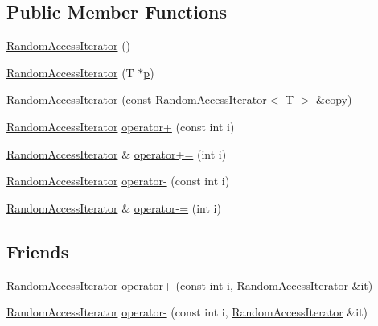 \subsection*{Public Member Functions}
\begin{DoxyCompactItemize}
\item 
\hyperlink{classprism_1_1_random_access_iterator_acb6e10c9ddfe99117be8d6655636a23c}{Random\+Access\+Iterator} ()
\item 
\hyperlink{classprism_1_1_random_access_iterator_aca286b76b9426a9be2224545ecce50e5}{Random\+Access\+Iterator} (T $\ast$\hyperlink{classprism_1_1_forward_iterator_a44e23472687df2dcf68780ba6173557a}{p})
\item 
\hyperlink{classprism_1_1_random_access_iterator_a6aeddeeacdf3146e6b48b05c8f86ac65}{Random\+Access\+Iterator} (const \hyperlink{classprism_1_1_random_access_iterator}{Random\+Access\+Iterator}$<$ T $>$ \&\hyperlink{namespaceprism_ae776f4cd825f79e7af1cf6ee1d90a209}{copy})
\item 
\hyperlink{classprism_1_1_random_access_iterator}{Random\+Access\+Iterator} \hyperlink{classprism_1_1_random_access_iterator_aebe91fcd9ac3a4bc5f2f2ede7ff51f49}{operator+} (const int i)
\item 
\hyperlink{classprism_1_1_random_access_iterator}{Random\+Access\+Iterator} \& \hyperlink{classprism_1_1_random_access_iterator_af66da8fe8bd73912a18dc14cf96c237c}{operator+=} (int i)
\item 
\hyperlink{classprism_1_1_random_access_iterator}{Random\+Access\+Iterator} \hyperlink{classprism_1_1_random_access_iterator_ac530d8ed2369500753f4091eba88142c}{operator-\/} (const int i)
\item 
\hyperlink{classprism_1_1_random_access_iterator}{Random\+Access\+Iterator} \& \hyperlink{classprism_1_1_random_access_iterator_ae17e26f0b1664830170c4373e951f3a5}{operator-\/=} (int i)
\end{DoxyCompactItemize}
\subsection*{Friends}
\begin{DoxyCompactItemize}
\item 
\hyperlink{classprism_1_1_random_access_iterator}{Random\+Access\+Iterator} \hyperlink{classprism_1_1_random_access_iterator_af54fbcdeeec8255f8e3d2742c952ea22}{operator+} (const int i, \hyperlink{classprism_1_1_random_access_iterator}{Random\+Access\+Iterator} \&it)
\item 
\hyperlink{classprism_1_1_random_access_iterator}{Random\+Access\+Iterator} \hyperlink{classprism_1_1_random_access_iterator_a207fb9ff199d97104c08cc684db50dfe}{operator-\/} (const int i, \hyperlink{classprism_1_1_random_access_iterator}{Random\+Access\+Iterator} \&it)
\end{DoxyCompactItemize}
